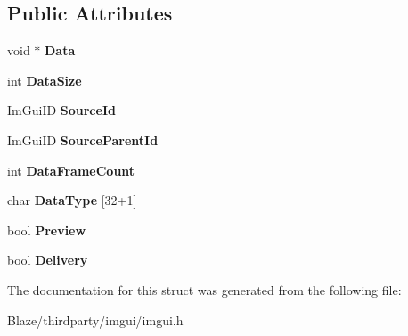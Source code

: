\subsection*{Public Attributes}
\begin{DoxyCompactItemize}
\item 
\mbox{\label{structImGuiPayload_af9f974dfb815e21a1ab925cab3769ab9}} 
void $\ast$ {\bfseries Data}
\item 
\mbox{\label{structImGuiPayload_a6730d3ace5353afe204273995994cd92}} 
int {\bfseries Data\+Size}
\item 
\mbox{\label{structImGuiPayload_aa574f7e237c6d2172977d142b25c0111}} 
Im\+Gui\+ID {\bfseries Source\+Id}
\item 
\mbox{\label{structImGuiPayload_a1757c714dd47f09b645a8eba2912849d}} 
Im\+Gui\+ID {\bfseries Source\+Parent\+Id}
\item 
\mbox{\label{structImGuiPayload_ab9f21d2454197d14896d5812ba70fa33}} 
int {\bfseries Data\+Frame\+Count}
\item 
\mbox{\label{structImGuiPayload_a72ecfe510eb35932e54f11ee56fe7140}} 
char {\bfseries Data\+Type} \mbox{[}32+1\mbox{]}
\item 
\mbox{\label{structImGuiPayload_a1a5b6456247ef3c213f0706cc9da16e6}} 
bool {\bfseries Preview}
\item 
\mbox{\label{structImGuiPayload_a4c0900e12c8d0bf6869c0ac6f8a66e31}} 
bool {\bfseries Delivery}
\end{DoxyCompactItemize}


The documentation for this struct was generated from the following file\+:\begin{DoxyCompactItemize}
\item 
Blaze/thirdparty/imgui/imgui.\+h\end{DoxyCompactItemize}
